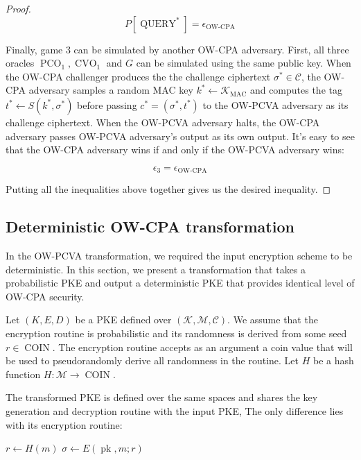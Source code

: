 \documentclass{article}
\newcommand{\pk}{\operatorname{pk}}
\newcommand{\pco}{\operatorname{PCO}}
\newcommand{\cvo}{\operatorname{CVO}}
\newcommand{\coin}{\operatorname{COIN}}
\newlength{\wdth}
\newcommand{\strike}[1]{\settowidth{\wdth}{#1}\rlap{\rule[.5ex]{\wdth}{.4pt}}#1}
\begin{document}
\begin{proof}
    \begin{equation*}
        P[\operatorname{QUERY}^\ast] = \epsilon_\text{OW-CPA}
    \end{equation*}

    Finally, game 3 can be simulated by another OW-CPA adversary. First, all three oracles $\pco_1, \cvo_1$ and $G$ can be simulated using the same public key. When the OW-CPA challenger produces the the challenge ciphertext $\sigma^\ast \in \mathcal{C}$, the OW-CPA adversary samples a random MAC key $k^\ast \leftarrow \mathcal{K}_\text{MAC}$ and computes the tag $t^\ast \leftarrow S(k^\ast, \sigma^\ast)$ before passing $c^\ast = (\sigma^\ast, t^\ast)$ to the OW-PCVA adversary as its challenge ciphertext. When the OW-PCVA adversary halts, the OW-CPA adversary passes OW-PCVA adversary's output as its own output. It's easy to see that the OW-CPA adversary wins if and only if the OW-PCVA adversary wins:

    \begin{equation*}
        \epsilon_3 = \epsilon_\text{OW-CPA}
    \end{equation*}

    Putting all the inequalities above together gives us the desired inequality.
\end{proof}

\subsection{Deterministic OW-CPA transformation}
In the OW-PCVA transformation, we required the input encryption scheme to be deterministic. In this section, we present a transformation that takes a probabilistic PKE and output a deterministic PKE that provides identical level of OW-CPA security.

Let $(K, E, D)$ be a PKE defined over $(\mathcal{K}, \mathcal{M}, \mathcal{C})$. We assume that the encryption routine is probabilistic and its randomness is derived from some seed $r \in \coin$. The encryption routine accepts as an argument a coin value that will be used to pseudorandomly derive all randomness in the routine. Let $H$ be a hash function $H: \mathcal{M} \rightarrow \coin$.

The transformed PKE is defined over the same spaces and shares the key generation and decryption routine with the input PKE, The only difference lies with its encryption routine:

\begin{algorithm}[H]
    \caption{$E^{\strike{\$}}$}
    \SetAlgoLined
    \KwIn{
        $(\pk, m)$
    }
    $r \leftarrow H(m)$\;
    $\sigma \leftarrow E(\pk, m; r)$\;
    \Return{$\sigma$}
\end{algorithm}
\end{document}
